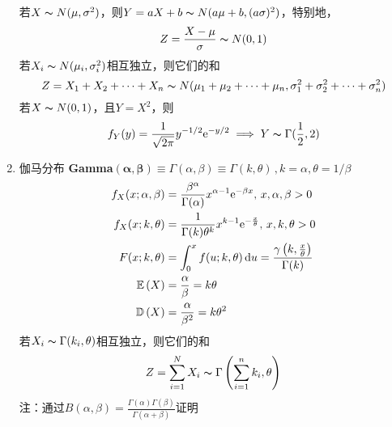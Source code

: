 \begin{enumerate}
	若$X\thicksim N(\mu,\sigma^2)$，则$Y=aX+b\thicksim N(a\mu+b,(a\sigma)^2)$，特别地，
	\[Z=\dfrac{X-\mu}{\sigma}\thicksim N(0,1)\]
	若$X_i\thicksim N(\mu_i,\sigma_i^2)$相互独立，则它们的和
	\[Z=X_1+X_2+\cdots+X_n\thicksim N(\mu_1+\mu_2+\cdots+\mu_n,\sigma_1^2+\sigma_2^2+\cdots+\sigma_n^2)\]
	若$X\thicksim N(0,1)$，且$Y=X^2$，则
	\[f_Y(y)=\frac{1}{\sqrt{2\pi}}y^{-1/2}\mathrm{e}^{-y/2}\implies Y\thicksim\Gamma(\frac{1}{2},2)\]
	\item 伽马分布 \textbf{Gamma$(\mathbf{\alpha},\mathbf{\beta})\equiv\Gamma (\alpha ,\beta )\equiv\Gamma (k,\theta)\,,k=\alpha,\theta=1/\beta$}
	\[\begin{aligned}
	f_X(x;\alpha ,\beta )&=\frac {\beta ^{\alpha }}{\Gamma (\alpha )}x^{\alpha -1}\mathrm{e}^{-\beta x},\,x,\alpha ,\beta >0\\
	f_X(x;k,\theta)&=\frac {1}{\Gamma (k)\theta ^{k}}x^{k-1}\mathrm{e}^{-{\frac {x}{\theta }}},\,x,k,\theta>0\\
	F(x;k,\theta )&=\int _{0}^{x}f(u;k,\theta )\,\mathrm{d} u={\frac {\gamma \left(k,{\frac {x}{\theta }}\right)}{\Gamma (k)}}\\
	\mathbb{E}\left(X\right)&={\frac {\alpha }{\beta }}=k\theta\\
	\mathbb{D}\left(X\right)&=\frac{\alpha}{\beta^2}=k\theta^2
	\end{aligned}\]	
	若$X_i\thicksim \Gamma(k_i,\theta)$相互独立，则它们的和
	\[Z=\sum_{i=1}^N X_i \thicksim\Gamma  \left( \sum_{i=1}^n k_i, \theta \right)\]
	注：通过$B(\alpha,\beta)=\frac{\Gamma(\alpha)\Gamma(\beta)}{\Gamma(\alpha+\beta)}$证明
\end{enumerate}